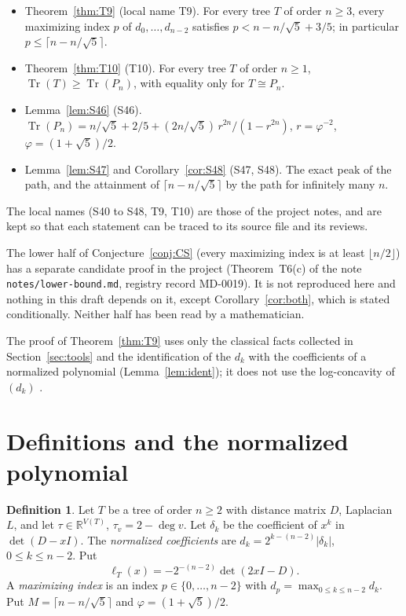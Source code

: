\documentclass[11pt]{amsart}
\theoremstyle{definition}
\newtheorem{definition}[theorem]{Definition}
\theoremstyle{remark}
\newcommand{\Tr}{\operatorname{Tr}}
\begin{document}
\begin{itemize}
\item Theorem~\ref{thm:T9} (local name T9). For every tree $T$ of order
$n\ge3$, every maximizing index $p$ of $d_0,\dots,d_{n-2}$ satisfies
$p<n-n/\sqrt5+3/5$; in particular $p\le\lceil n-n/\sqrt5\rceil$.
\item Theorem~\ref{thm:T10} (T10). For every tree $T$ of order $n\ge1$,
$\Tr(T)\ge\Tr(P_n)$, with equality only for $T\cong P_n$.
\item Lemma~\ref{lem:S46} (S46). $\Tr(P_n)=n/\sqrt5+2/5+(2n/\sqrt5)\,r^{2n}/(1-r^{2n})$,
$r=\varphi^{-2}$, $\varphi=(1+\sqrt5)/2$.
\item Lemma~\ref{lem:S47} and Corollary~\ref{cor:S48} (S47, S48). The exact
peak of the path, and the attainment of $\lceil n-n/\sqrt5\rceil$ by the path
for infinitely many $n$.
\end{itemize}
The local names (S40 to S48, T9, T10) are those of the project notes, and
are kept so that each statement can be traced to its source file and its
reviews.

The lower half of Conjecture~\ref{conj:CS} (every maximizing index is at
least $\lfloor n/2\rfloor$) has a separate candidate proof in the project
(Theorem~T6(c) of the note \nolinkurl{notes/lower-bound.md}, registry record
MD-0019). It is not reproduced here and nothing in this draft depends on it,
except Corollary~\ref{cor:both}, which is stated conditionally. Neither half
has been read by a mathematician.

The proof of Theorem~\ref{thm:T9} uses only the classical facts collected in
Section~\ref{sec:tools} and the identification of the $d_k$ with the
coefficients of a normalized polynomial (Lemma~\ref{lem:ident}); it does not
use the log-concavity of $(d_k)$ \cite[Theorem~2.1]{AAB}.

\section{Definitions and the normalized polynomial}\label{sec:defs}

\begin{definition}\label{def:dk}
Let $T$ be a tree of order $n\ge2$ with distance matrix $D$, Laplacian $L$,
and let $\tau\in\mathbb R^{V(T)}$, $\tau_v=2-\deg v$. Let $\delta_k$ be the
coefficient of $x^k$ in $\det(D-xI)$. The \emph{normalized coefficients}
are $d_k=2^{k-(n-2)}|\delta_k|$, $0\le k\le n-2$. Put
\[
\ell_T(x)=-2^{-(n-2)}\det(2xI-D).
\]
A \emph{maximizing index} is an index $p\in\{0,\dots,n-2\}$ with
$d_p=\max_{0\le k\le n-2}d_k$. Put $M=\lceil n-n/\sqrt5\rceil$ and
$\varphi=(1+\sqrt5)/2$.
\end{definition}
\end{document}
